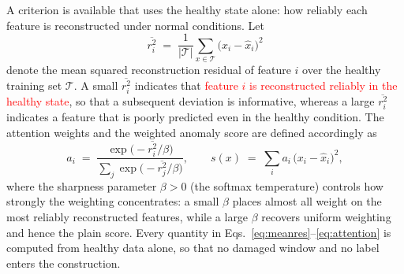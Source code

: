 \documentclass[11pt,a4paper]{article}
\begin{document}
A criterion is available that uses the healthy state alone: how reliably each
feature is reconstructed under normal conditions. Let
\begin{equation}
\overline{r_i^2} \;=\; \frac{1}{|\mathcal{T}|}\sum_{x\in\mathcal{T}}
\bigl(x_i - \hat{x}_i\bigr)^2
\label{eq:meanres}
\end{equation}
denote the mean squared reconstruction residual of feature $i$ over the healthy
training set $\mathcal{T}$. A small $\overline{r_i^2}$ indicates that
\textcolor{red}{feature $i$ is reconstructed reliably in the healthy state}, so that a subsequent deviation is
informative, whereas a large $\overline{r_i^2}$ indicates a feature that is poorly
predicted even in the healthy condition. The attention weights and the weighted
anomaly score are defined accordingly as
\begin{equation}
a_i \;=\;
\frac{\exp\!\bigl(-\overline{r_i^2}/\beta\bigr)}
     {\sum_{j} \exp\!\bigl(-\overline{r_j^2}/\beta\bigr)},
\qquad
s(x) \;=\; \sum_{i} a_i\,\bigl(x_i-\hat{x}_i\bigr)^2 ,
\label{eq:attention}
\end{equation}
where the sharpness parameter $\beta > 0$ (the softmax temperature) controls how
strongly the weighting concentrates: a small $\beta$ places almost all weight on
the most reliably reconstructed features, while a large $\beta$ recovers uniform
weighting and hence the plain score. Every
quantity in Eqs.~\eqref{eq:meanres}--\eqref{eq:attention} is computed from healthy
data alone, so that no damaged window and no label enters the construction.
\end{document}
